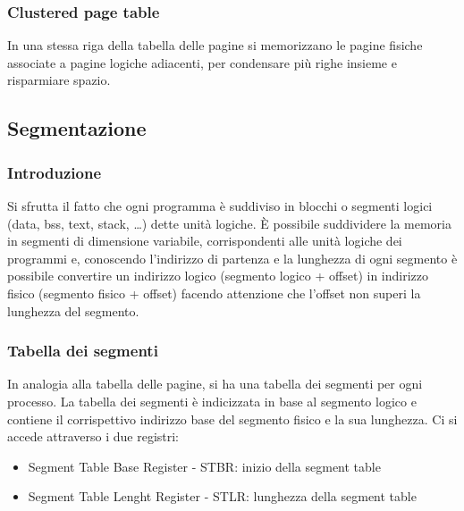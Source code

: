 \documentclass[a4paper]{article}
\begin{document}
\subsubsection*{Clustered page table}
In una stessa riga della tabella delle pagine si memorizzano le pagine fisiche associate a pagine logiche adiacenti, per
condensare più righe insieme e risparmiare spazio.


\subsection{Segmentazione}
\subsubsection*{Introduzione}
Si sfrutta il fatto che ogni programma è suddiviso in blocchi o segmenti logici (data, bss, text, stack, \dots) dette unità
logiche. È possibile suddividere la memoria in segmenti di dimensione variabile, corrispondenti alle unità logiche dei programmi
e, conoscendo l'indirizzo di partenza e la lunghezza di ogni segmento è possibile convertire un indirizzo logico (segmento logico
+ offset) in indirizzo fisico (segmento fisico + offset) facendo attenzione che l'offset non superi la lunghezza del segmento.

\subsubsection*{Tabella dei segmenti}
In analogia alla tabella delle pagine, si ha una tabella dei segmenti per ogni processo. La tabella dei segmenti è indicizzata
in base al segmento logico e contiene il corrispettivo indirizzo base del segmento fisico e la sua lunghezza. Ci si accede
attraverso i due registri:
\begin{itemize}
	\item Segment Table Base Register - STBR: inizio della segment table
	\item Segment Table Lenght Register - STLR: lunghezza della segment table
\end{itemize}
\end{document}
